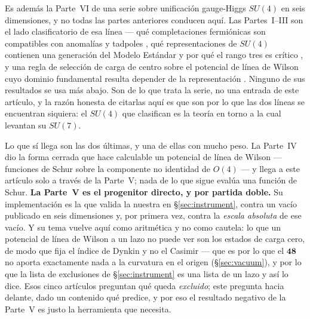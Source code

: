 \documentclass[11pt,a4paper]{article}
\newcommand{\su}[1]{SU(#1)}
\newcommand{\rep}[1]{\mathbf{#1}}
\begin{document}
Es además la Parte~VI de una serie sobre unificación gauge-Higgs $\su4$ en seis dimensiones, y no
todas las partes anteriores conducen aquí. Las Partes~I--III son el lado clasificatorio de esa línea
--- qué completaciones fermiónicas son compatibles con anomalías y tadpoles \cite{PartI}, qué
representaciones de $\su4$ contienen una generación del Modelo Estándar y por qué el rango tres es
crítico \cite{PartII}, y una regla de selección de carga de centro sobre el potencial de línea de
Wilson cuyo dominio fundamental resulta depender de la representación \cite{PartIII}. Ninguno de sus
resultados se usa más abajo. Son de lo que trata la serie, no una entrada de este artículo, y la razón
honesta de citarlas aquí es que son por lo que las dos líneas se encuentran siquiera: el $\su4$ que
clasifican es la teoría en torno a la cual \cite{KM25} levantan su $\su7$.

Lo que sí llega son las dos últimas, y una de ellas con mucho peso. La Parte~IV dio la forma cerrada
que hace calculable un potencial de línea de Wilson --- funciones de Schur sobre la componente no
identidad de $O(4)$ \cite{PartIV} --- y llega a este artículo solo a través de la Parte~V; nada de lo
que sigue evalúa una función de Schur. \textbf{La Parte~V \cite{PartV} es el progenitor directo, y por
partida doble.} Su implementación es la que valida la nuestra en \S\ref{sec:instrument}, contra un
vacío publicado en seis dimensiones y, por primera vez, contra la \emph{escala absoluta} de ese vacío.
Y su tema vuelve aquí como aritmética y no como cautela: lo que un potencial de línea de Wilson a un
lazo no puede ver son los estados de carga cero, de modo que fija el índice de Dynkin y no el Casimir
--- que es por lo que el $\rep{48}$ no aporta exactamente nada a la curvatura en el origen
(\S\ref{sec:vacuum}), y por lo que la lista de exclusiones de \S\ref{sec:instrument} es una lista de
un lazo y así lo dice. Esos cinco artículos preguntan qué queda \emph{excluido}; este pregunta hacia
delante, dado un contenido qué predice, y por eso el resultado negativo de la Parte~V es justo la
herramienta que necesita.
\end{document}

